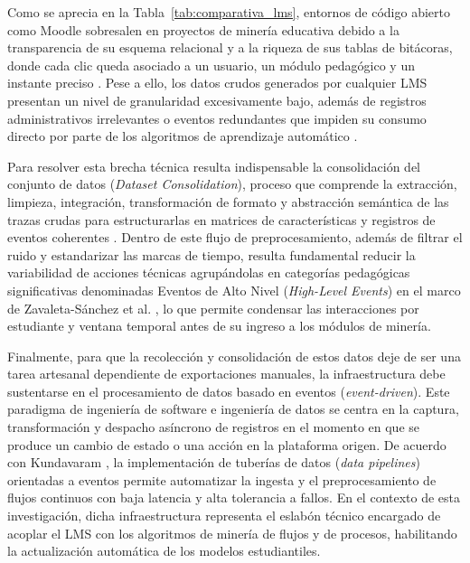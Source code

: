 Como se aprecia en la Tabla~\ref{tab:comparativa_lms}, entornos de código abierto como Moodle sobresalen en proyectos de minería educativa debido a la transparencia de su esquema relacional y a la riqueza de sus tablas de bitácoras, donde cada clic queda asociado a un usuario, un módulo pedagógico y un instante preciso \cite{Romero2020, Supriyanto2025}. Pese a ello, los datos crudos generados por cualquier LMS presentan un nivel de granularidad excesivamente bajo, además de registros administrativos irrelevantes o eventos redundantes que impiden su consumo directo por parte de los algoritmos de aprendizaje automático \cite{Bogarin2018}.

Para resolver esta brecha técnica resulta indispensable la consolidación del conjunto de datos (\textit{Dataset Consolidation}), proceso que comprende la extracción, limpieza, integración, transformación de formato y abstracción semántica de las trazas crudas para estructurarlas en matrices de características y registros de eventos coherentes \cite{Romero2020, Bogarin2018}. Dentro de este flujo de preprocesamiento, además de filtrar el ruido y estandarizar las marcas de tiempo, resulta fundamental reducir la variabilidad de acciones técnicas agrupándolas en categorías pedagógicas significativas denominadas Eventos de Alto Nivel (\textit{High-Level Events}) en el marco de Zavaleta-Sánchez et al. \cite{YeseniaZavaleta-Sanchez2025}, lo que permite condensar las interacciones por estudiante y ventana temporal antes de su ingreso a los módulos de minería.

Finalmente, para que la recolección y consolidación de estos datos deje de ser una tarea artesanal dependiente de exportaciones manuales, la infraestructura debe sustentarse en el procesamiento de datos basado en eventos (\textit{event-driven}). Este paradigma de ingeniería de software e ingeniería de datos se centra en la captura, transformación y despacho asíncrono de registros en el momento en que se produce un cambio de estado o una acción en la plataforma origen. De acuerdo con Kundavaram \cite{Kundavaram2025}, la implementación de tuberías de datos (\textit{data pipelines}) orientadas a eventos permite automatizar la ingesta y el preprocesamiento de flujos continuos con baja latencia y alta tolerancia a fallos. En el contexto de esta investigación, dicha infraestructura representa el eslabón técnico encargado de acoplar el LMS con los algoritmos de minería de flujos y de procesos, habilitando la actualización automática de los modelos estudiantiles.

